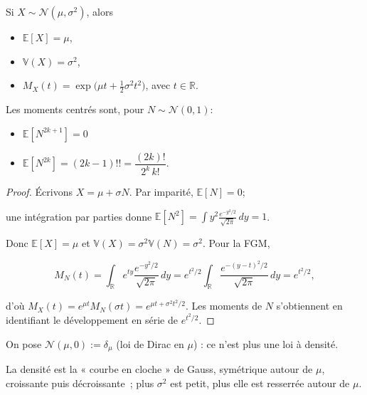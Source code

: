 \medskip

\begin{mdframed}
\begin{proposition}
Si $X\sim\mathcal N(\mu,\sigma^2)$, alors

\begin{itemize}
\item $\mathbb{E}[X]=\mu$, 
\item $\mathbb{V}(X)=\sigma^2$,
\item $M_X(t)=\exp\!\Big(\mu t+\tfrac12\sigma^2 t^2\Big)$, avec $t\in\mathbb{R}$.
\end{itemize}

Les moments centrés sont, pour $N\sim\mathcal N(0,1)$:

\begin{itemize}
\item $\mathbb{E}[N^{2k+1}]=0$ 
\item $\mathbb{E}[N^{2k}]=(2k-1)!!=\dfrac{(2k)!}{2^k\,k!}$.
\end{itemize}
\end{proposition}
\end{mdframed}

\begin{proof}
Écrivons $X=\mu+\sigma N$. Par imparité, $\mathbb{E}[N]=0$; 

une intégration par parties donne $\mathbb{E}[N^2]=\int y^2\frac{e^{-y^2/2}}{\sqrt{2\pi}}\,dy=1$. 

Donc $\mathbb{E}[X]=\mu$ et $\mathbb{V}(X)=\sigma^2\mathbb{V}(N)=\sigma^2$. Pour la FGM,

\[
  M_N(t)=\int_\mathbb{R} e^{ty}\frac{e^{-y^2/2}}{\sqrt{2\pi}}\,dy
  =e^{t^2/2}\int_\mathbb{R}\frac{e^{-(y-t)^2/2}}{\sqrt{2\pi}}\,dy=e^{t^2/2},
\]

d'où $M_X(t)=e^{\mu t}M_N(\sigma t)=e^{\mu t+\sigma^2t^2/2}$. Les moments de
$N$ s'obtiennent en identifiant le développement en série de $e^{t^2/2}$.
\end{proof}

\medskip

\begin{mdframed}
\begin{proposition}[Convention $\sigma=0$]
On pose $\mathcal N(\mu,0):=\delta_\mu$ (loi de Dirac en $\mu$) : ce n'est plus
une loi à densité.
\end{proposition}
\end{mdframed}

\begin{remarque}
La densité est la « courbe en cloche » de Gauss, symétrique autour de $\mu$,
croissante puis décroissante~; plus $\sigma^2$ est petit, plus elle est
resserrée autour de $\mu$.
\end{remarque}

